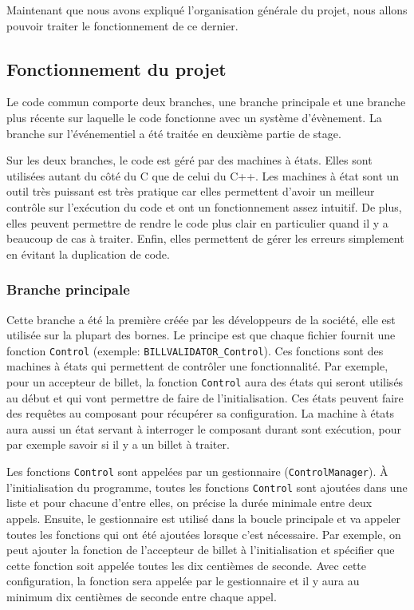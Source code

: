 \documentclass[a4paper]{article}
\begin{document}
Maintenant que nous avons expliqué l'organisation générale du projet, nous
allons pouvoir traiter le fonctionnement de ce dernier.

\subsection{Fonctionnement du projet}

Le code commun comporte deux branches, une branche principale et une branche
plus récente sur laquelle le code fonctionne avec un système d'évènement. La
branche sur l'événementiel a été traitée en deuxième partie de stage.

Sur les deux branches, le code est géré par des machines à états. Elles sont
utilisées autant du côté du C que de celui du C++. Les machines à état sont un
outil très puissant est très pratique car elles permettent d'avoir un meilleur
contrôle sur l'exécution du code et ont un fonctionnement assez intuitif. De
plus, elles peuvent permettre de rendre le code plus clair en particulier quand
il y a beaucoup de cas à traiter. Enfin, elles permettent de gérer les erreurs
simplement en évitant la duplication de code.

\subsubsection{Branche principale}

Cette branche a été la première créée par les développeurs de la société, elle
est utilisée sur la plupart des bornes. Le principe est que chaque fichier
fournit une fonction \verb|Control| (exemple: \verb|BILLVALIDATOR_Control|). Ces
fonctions sont des machines à états qui permettent de contrôler une
fonctionnalité. Par exemple, pour un accepteur de billet, la fonction
\verb|Control| aura des états qui seront utilisés au début et qui vont permettre
de faire de l'initialisation. Ces états peuvent faire des requêtes au composant
pour récupérer sa configuration. La machine à états aura aussi un état servant à
interroger le composant durant sont exécution, pour par exemple savoir si il y a
un billet à traiter.

Les fonctions \verb|Control| sont appelées par un gestionnaire
(\verb|ControlManager|). À l'initialisation du programme, toutes les fonctions
\verb|Control| sont ajoutées dans une liste et pour chacune d'entre elles, on
précise la durée minimale entre deux appels. Ensuite, le gestionnaire est
utilisé dans la boucle principale et va appeler toutes les fonctions qui ont été
ajoutées lorsque c'est nécessaire. Par exemple, on peut ajouter la fonction de
l'accepteur de billet à l'initialisation et spécifier que cette fonction soit
appelée toutes les dix centièmes de seconde. Avec cette configuration, la
fonction sera appelée par le gestionnaire et il y aura au minimum dix centièmes
de seconde entre chaque appel.
\end{document}
